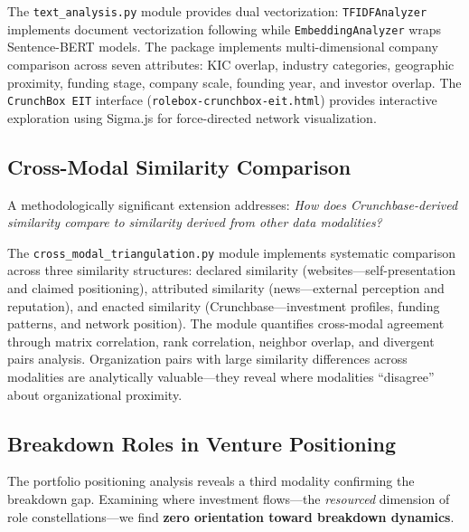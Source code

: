 \documentclass[../main.tex]{subfiles}
\begin{document}
The \texttt{text\_analysis.py} module provides dual vectorization: \texttt{TFIDFAnalyzer} implements document vectorization following \cite{basole2019visual} while \texttt{EmbeddingAnalyzer} wraps Sentence-BERT models. The package implements multi-dimensional company comparison across seven attributes: KIC overlap, industry categories, geographic proximity, funding stage, company scale, founding year, and investor overlap. The \texttt{CrunchBox EIT} interface (\texttt{rolebox-crunchbox-eit.html}) provides interactive exploration using Sigma.js for force-directed network visualization.

\subsection{Cross-Modal Similarity Comparison}

A methodologically significant extension addresses: \emph{How does Crunchbase-derived similarity compare to similarity derived from other data modalities?}

The \texttt{cross\_modal\_triangulation.py} module implements systematic comparison across three similarity structures: declared similarity (websites---self-presentation and claimed positioning), attributed similarity (news---external perception and reputation), and enacted similarity (Crunchbase---investment profiles, funding patterns, and network position). The module quantifies cross-modal agreement through matrix correlation, rank correlation, neighbor overlap, and divergent pairs analysis. Organization pairs with large similarity differences across modalities are analytically valuable---they reveal where modalities ``disagree'' about organizational proximity.


\subsection{Breakdown Roles in Venture Positioning}

The portfolio positioning analysis reveals a third modality confirming the breakdown gap. Examining where investment flows---the \emph{resourced} dimension of role constellations---we find \textbf{zero orientation toward breakdown dynamics}.
\end{document}
